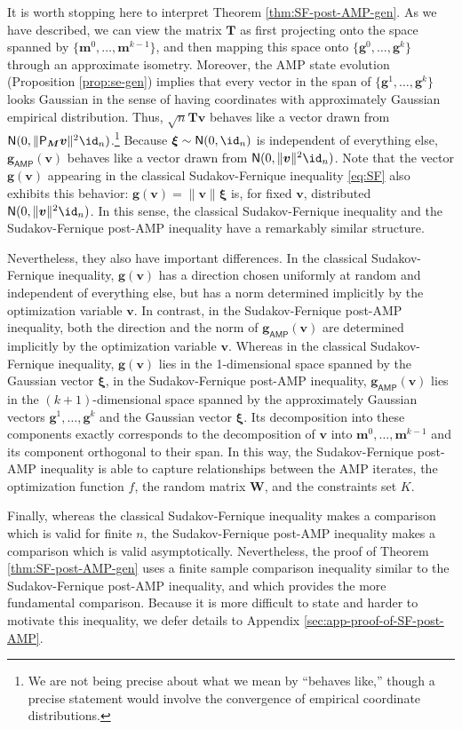 \documentclass[]{article}
\def\bW{{\boldsymbol W}}
\def\normal{{\sf N}}
\def\bv{{\boldsymbol V}}
\def\bM{{\boldsymbol M}}
\def\bT{\boldsymbol{T}}
\def\proj{{\mathsf P}}
\def\bg{{\boldsymbol g}}
\def\bv{{\boldsymbol v}}
\def\bxi{{\boldsymbol \xi}}
\def\bW{{\boldsymbol W}}
\def\bv{{\boldsymbol v}}
\def\proj{{\mathsf P}}
\def\normal{{\sf N}}
\def\bg{{\boldsymbol g}}
\def\bbm{{\boldsymbol m}}
\def\AMP{\mathsf{AMP}}
\begin{document}
It is worth stopping here to interpret Theorem \ref{thm:SF-post-AMP-gen}.
As we have described,
we can view the matrix $\bT$ as first projecting onto the space spanned by $\{ \bbm^0,\ldots,\bbm^{k-1}\}$,
and then mapping this space onto $\{ \bg^0,\ldots,\bg^k\}$ through an approximate isometry. 
Moreover, the AMP state evolution (Proposition \ref{prop:se-gen}) implies that every vector in the span of $\{ \bg^1, \ldots,\bg^k\}$ looks Gaussian in the sense of having coordinates with approximately Gaussian empirical distribution. 
Thus, $\sqrt{n}\bT \bv$ behaves like a vector drawn from $\normal(0,\| \proj_{\bM}\bv \|^2 \id_n)$.\footnote{We are not being precise about what we mean by ``behaves like,'' though a precise statement would involve the convergence of empirical coordinate distributions.}
Because $\bxi \sim \normal(0,\id_n)$ is independent of everything else,
$\bg_{\AMP}(\bv)$ behaves like a vector drawn from $\normal(0,\| \bv \|^2 \id_n)$.
Note that the vector $\bg(\bv)$ appearing in the classical Sudakov-Fernique inequality \eqref{eq:SF} also exhibits this behavior: $\bg(\bv) = \| \bv \|\bxi$ is, for fixed $\bv$, distributed $\normal(0,\| \bv \|^2 \id_n)$.
In this sense, the classical Sudakov-Fernique inequality and the Sudakov-Fernique post-AMP inequality have a remarkably similar structure.

Nevertheless, they also have important differences.
In the classical Sudakov-Fernique inequality, $\bg(\bv)$ has a direction chosen uniformly at random and independent of everything else, but has a norm determined implicitly by the optimization variable $\bv$. 
In contrast,
in the Sudakov-Fernique post-AMP inequality, 
both the direction and the norm of $\bg_{\AMP}(\bv)$ are determined implicitly by the optimization variable $\bv$.
Whereas in the classical Sudakov-Fernique inequality, $\bg(\bv)$ lies in the 1-dimensional space spanned by the Gaussian vector $\bxi$,
in the Sudakov-Fernique post-AMP inequality, $\bg_{\AMP}(\bv)$ lies in the $(k+1)$-dimensional space spanned by the approximately Gaussian vectors $\bg^1,\ldots,\bg^k$ and the Gaussian vector $\bxi$.
Its decomposition into these components exactly corresponds to the decomposition of $\bv$ into $\bbm^0,\ldots,\bbm^{k-1}$ and its component orthogonal to their span.
In this way, the Sudakov-Fernique post-AMP inequality is able to capture relationships between the AMP iterates, the optimization function $f$, the random matrix $\bW$, and the constraints set $K$.

Finally, whereas the classical Sudakov-Fernique inequality makes a comparison which is valid for finite $n$,
the Sudakov-Fernique post-AMP inequality makes a comparison which is valid asymptotically. 
Nevertheless, the proof of Theorem \ref{thm:SF-post-AMP-gen} uses a finite sample comparison inequality similar to the Sudakov-Fernique post-AMP inequality, and which provides the more fundamental comparison.
Because it is more difficult to state and harder to motivate this inequality, we defer details to Appendix \ref{sec:app-proof-of-SF-post-AMP}.
\end{document}

